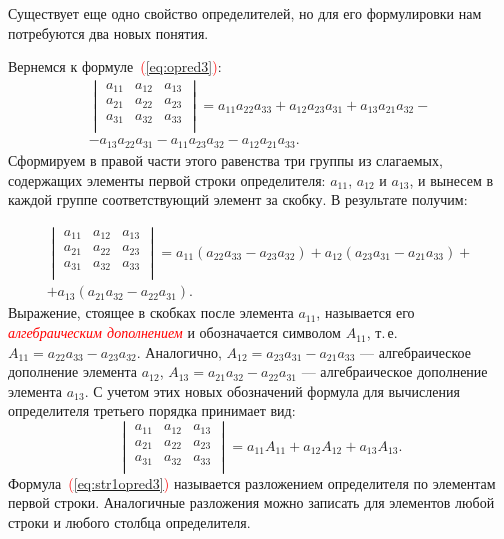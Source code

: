 \documentclass[10pt]{article}
\numberwithin{primer}{section}
\newcommand{\term}[1]{\textcolor{red}{\emph{#1}}}
\numberwithin{equation}{section}
\newcommand{\refform}[1]{\textcolor{red}{(\ref{#1})}}
\begin{document}
Существует еще одно свойство определителей, но для его
формулировки нам потребуются два новых понятия.

Вернемся к формуле~\refform{eq:opred3}:
\begin{multline*}\begin{vmatrix}
  a_{11} & a_{12} & a_{13}\\
  a_{21} & a_{22} & a_{23}\\
  a_{31} & a_{32} & a_{33}\\
\end{vmatrix}=a_{11}a_{22}a_{33}+a_{12}a_{23}a_{31}+a_{13}a_{21}a_{32}-\\
-a_{13}a_{22}a_{31}-a_{11}a_{23}a_{32}-a_{12}a_{21}a_{33}.
\end{multline*}
Сформируем в правой части этого равенства три группы из слагаемых, содержащих элементы  первой
строки определителя: $a_{11}$, $a_{12}$ и $a_{13}$,  и вынесем в
каждой группе соответствующий элемент за скобку. В результате
получим:

\begin{multline*}
\begin{vmatrix}
  a_{11} & a_{12} & a_{13}\\
  a_{21} & a_{22} & a_{23}\\
  a_{31} & a_{32} & a_{33}\\
\end{vmatrix}=a_{11}\left(a_{22}a_{33}-a_{23}a_{32}\right)+a_{12}\left(a_{23}a_{31}-a_{21}a_{33}\right)+\\
+a_{13}\left(a_{21}a_{32}-a_{22}a_{31}\right).
\end{multline*}
Выражение, стоящее в скобках после элемента $a_{11}$, называется
его \term{алгебраическим дополнением} и обозначается символом
$A_{11}$, т.\,е. $A_{11}=a_{22}a_{33}-a_{23}a_{32}$. Аналогично,
$A_{12}=a_{23}a_{31}-a_{21}a_{33}$ --- алгебраическое дополнение
элемента $a_{12}$, $A_{13}=a_{21}a_{32}-a_{22}a_{31}$
--- алгебраическое дополнение элемента $a_{13}$. С учетом этих
новых обозначений формула для вычисления определителя третьего
порядка принимает вид:
\begin{equation}\label{eq:str1opred3}
\begin{vmatrix}
  a_{11} & a_{12} & a_{13}\\
  a_{21} & a_{22} & a_{23}\\
  a_{31} & a_{32} & a_{33}\\
\end{vmatrix}=a_{11}A_{11}+a_{12}A_{12}+a_{13}A_{13}.
\end{equation}
Формула~\refform{eq:str1opred3} называется разложением определителя по элементам
первой строки. Аналогичные разложения можно записать для элементов
любой строки и любого столбца определителя.
\end{document}
